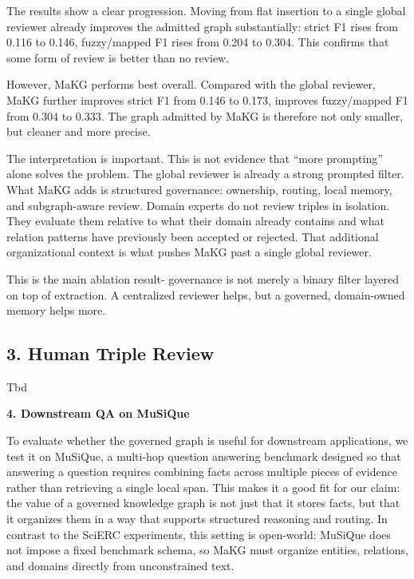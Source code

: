 The results show a clear progression. Moving from flat insertion to a
single global reviewer already improves the admitted graph
substantially: strict F1 rises from 0.116 to 0.146, fuzzy/mapped F1
rises from 0.204 to 0.304. This confirms that some form of review is
better than no review.

However, MaKG performs best overall. Compared with the global reviewer,
MaKG further improves strict F1 from 0.146 to 0.173, improves
fuzzy/mapped F1 from 0.304 to 0.333. The graph admitted by MaKG is
therefore not only smaller, but cleaner and more precise.

The interpretation is important. This is not evidence that ``more
prompting'' alone solves the problem. The global reviewer is already a
strong prompted filter. What MaKG adds is structured governance:
ownership, routing, local memory, and subgraph-aware review. Domain
experts do not review triples in isolation. They evaluate them relative
to what their domain already contains and what relation patterns have
previously been accepted or rejected. That additional organizational
context is what pushes MaKG past a single global reviewer.

This is the main ablation result- governance is not merely a binary
filter layered on top of extraction. A centralized reviewer helps, but a
governed, domain-owned memory helps more.

\subsection{3. Human Triple Review}\label{human-triple-review}

Tbd

\textbf{4. Downstream QA on MuSiQue}

To evaluate whether the governed graph is useful for downstream
applications, we test it on MuSiQue, a multi-hop question answering
benchmark designed so that answering a question requires combining facts
across multiple pieces of evidence rather than retrieving a single local
span. This makes it a good fit for our claim: the value of a governed
knowledge graph is not just that it stores facts, but that it organizes
them in a way that supports structured reasoning and routing. In
contrast to the SciERC experiments, this setting is open-world: MuSiQue
does not impose a fixed benchmark schema, so MaKG must organize
entities, relations, and domains directly from unconstrained text.

